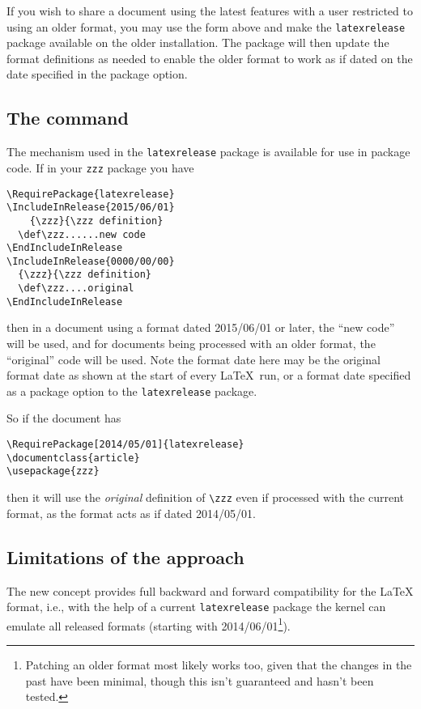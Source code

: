\documentclass{ltnews}
\providecommand\pkg[1]{\texttt{#1}}
\begin{document}
If you wish to share a document using the latest features with a
user restricted to using an older
format, you may use the form above and make the \pkg{latexrelease} package
available on the older installation.  The package will then update the format
definitions as needed to enable the older format to work as if dated on the date
specified in the package option.

\subsection{The  command}

The mechanism used in the \pkg{latexrelease} package is available for use in
package code. If in your \pkg{zzz} package you have
\begin{verbatim}
\RequirePackage{latexrelease}
\IncludeInRelease{2015/06/01}
    {\zzz}{\zzz definition}
  \def\zzz......new code
\EndIncludeInRelease
\IncludeInRelease{0000/00/00}
  {\zzz}{\zzz definition}
  \def\zzz....original
\EndIncludeInRelease
\end{verbatim}
then in a document using a format dated 2015/06/01 or later, the ``new code''
will be used, and for documents being processed with an older format, the
``original'' code will be used. Note the format date here may be the original
format date as shown at the start of every \LaTeX\ run, or a format date
specified as a package option to the \pkg{latexrelease} package.

So if the document has
\begin{verbatim}
\RequirePackage[2014/05/01]{latexrelease}
\documentclass{article}
\usepackage{zzz}
\end{verbatim}
then it will use the \emph{original} definition of \verb|\zzz| even if
processed with the current format, as the format acts as if dated 2014/05/01.


\subsection{Limitations of the approach}

The new concept provides full backward and forward compatibility for
the \LaTeX{} format, i.e., with the help of a current
\pkg{latexrelease} package the kernel can emulate all released
formats (starting with 2014/06/01\footnote{Patching an older format
  most likely works too, given that the changes in the past have been
  minimal, though this isn't guaranteed and hasn't been tested.}).
\end{document}
